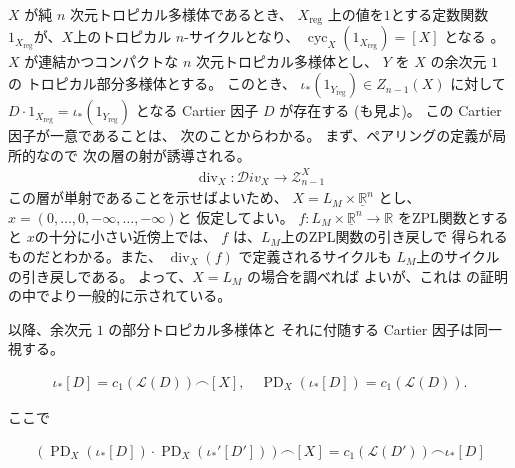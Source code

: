 \documentclass[a4paper,dvipdfmx,reqno,12pt]{amsart}
\theoremstyle{definition}
\newcommand{\opn}[1]{\operatorname{#1}}
\numberwithin{equation}{section}
\begin{document}
$X$ が純 $n$ 次元トロピカル多様体であるとき、
$X_{\mathrm{reg}}$ 上の値を$1$とする定数関数
$1_{X_{\mathrm{reg}}}$が、$X$上のトロピカル
$n$-サイクルとなり、
$\opn{cyc}_X(1_{X_{\mathrm{reg}}})=[X]$
となる \cite[Definition 5.3]{gross2019sheaftheoretic}。
$X$ が連結かつコンパクトな $n$ 次元トロピカル多様体とし、
$Y$ を $X$ の余次元 $1$ の
トロピカル部分多様体とする。
このとき、
$\iota_*(1_{Y_{\opn{reg}}})\in Z_{n-1}(X)$ に対して
$D\cdot 1_{X_{\mathrm{reg}}}=\iota_*(1_{Y_{\opn{reg}}})$
となる Cartier 因子 $D$ が存在する
\cite[Lemma 2.23]{MR3032930}
(\cite[Proposition 3.27]{shaw2015tropical}も見よ)。
この Cartier 因子が一意であることは、
次のことからわかる。
まず、ペアリングの定義が局所的なので
次の層の射が誘導される。
\begin{align}
\opn{div}_X\colon \mathcal{D}iv_X\to 
\mathscr{Z}_{n-1}^{X}
\end{align}
この層が単射であることを示せばよいため、
$X=L_M\times \underline{\mathbb{R}}^{n}$ とし、
$x=(0,\ldots,0,-\infty,\ldots,-\infty)$と
仮定してよい。
$f\colon L_M\times \underline{\mathbb{R}}^{n}\to 
\mathbb{R}$ をZPL関数とすると
$x$の十分に小さい近傍上では、
$f$ は、$L_M$上のZPL関数の引き戻しで
得られるものだとわかる。また、
$\opn{div}_X(f)$ で定義されるサイクルも
$L_M$上のサイクルの引き戻しである。
よって、$X=L_M$ の場合を調べれば
よいが、これは
\cite[Theorem 4.5]{MR4246795}
の証明の中でより一般的に示されている。

以降、余次元 $1$ の部分トロピカル多様体と
それに付随する Cartier 因子は同一視する。

\begin{align}
\iota_*[D]=c_1(\mathcal{L}(D))\frown [X], \quad
\opn{PD}_X(\iota_*[D])=c_1(\mathcal{L}(D)).
\end{align}

ここで

\begin{align}
(\opn{PD}_X(\iota_*[D])\cdot \opn{PD}_X(\iota_*'[D']))\frown [X]=
c_1(\mathcal{L}(D'))\frown \iota_*[D]
\end{align}




\end{document}
